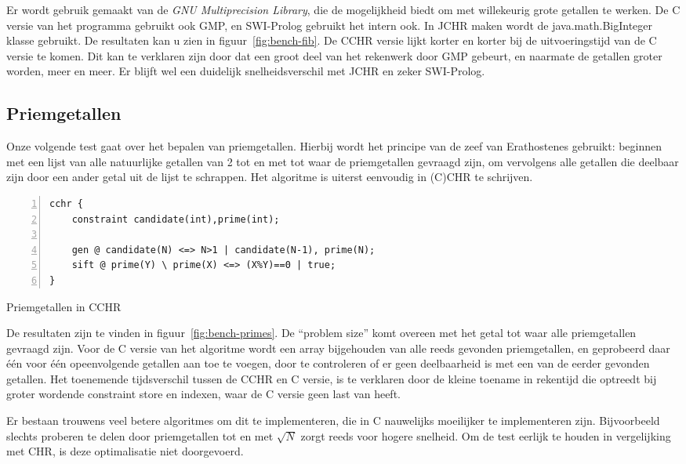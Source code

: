 Er wordt gebruik gemaakt van de {\em GNU Multiprecision Library}, die de mogelijkheid biedt om met willekeurig grote getallen te werken. De C versie van het programma gebruikt ook GMP, en SWI-Prolog gebruikt het intern ook. In JCHR maken wordt de java.math.BigInteger klasse gebruikt. De resultaten kan u zien in figuur~\ref{fig:bench-fib}. De CCHR versie lijkt korter en korter bij de uitvoeringstijd van de C versie te komen. Dit kan te verklaren zijn door dat een groot deel van het rekenwerk door GMP gebeurt, en naarmate de getallen groter worden, meer en meer. Er blijft wel een duidelijk snelheidsverschil met JCHR en zeker SWI-Prolog.

\subsection{Priemgetallen} \label{sec:bench-primes}

Onze volgende test gaat over het bepalen van priemgetallen. Hierbij wordt het principe van de zeef van Erathostenes gebruikt: beginnen met een lijst van alle natuurlijke getallen van 2 tot en met tot waar de priemgetallen gevraagd zijn, om vervolgens alle getallen die deelbaar zijn door een ander getal uit de lijst te schrappen. Het algoritme is uiterst eenvoudig in (C)CHR te schrijven.
\begin{exCode}
\begin{Verbatim}[frame=single,numbers=left]
cchr {
    constraint candidate(int),prime(int);

    gen @ candidate(N) <=> N>1 | candidate(N-1), prime(N);
    sift @ prime(Y) \ prime(X) <=> (X%Y)==0 | true;
}
\end{Verbatim}
\caption{\label{code:primes} Priemgetallen in CCHR}
\end{exCode}
De resultaten zijn te vinden in figuur~\ref{fig:bench-primes}. De ``problem size'' komt overeen met het getal tot waar alle priemgetallen gevraagd zijn. Voor de C versie van het algoritme wordt een array bijgehouden van alle reeds gevonden priemgetallen, en geprobeerd daar \'e\'en voor \'e\'en opeenvolgende getallen aan toe te voegen, door te controleren of er geen deelbaarheid is met een van de eerder gevonden getallen. Het toenemende tijdsverschil tussen de CCHR en C versie, is te verklaren door de kleine toename in rekentijd die optreedt bij groter wordende constraint store en indexen, waar de C versie geen last van heeft.

Er bestaan trouwens veel betere algoritmes om dit te implementeren, die in C nauwelijks moeilijker te implementeren zijn. Bijvoorbeeld slechts proberen te delen door priemgetallen tot en met $\sqrt{N}$ zorgt reeds voor hogere snelheid. Om de test eerlijk te houden in vergelijking met CHR, is deze optimalisatie niet doorgevoerd.

